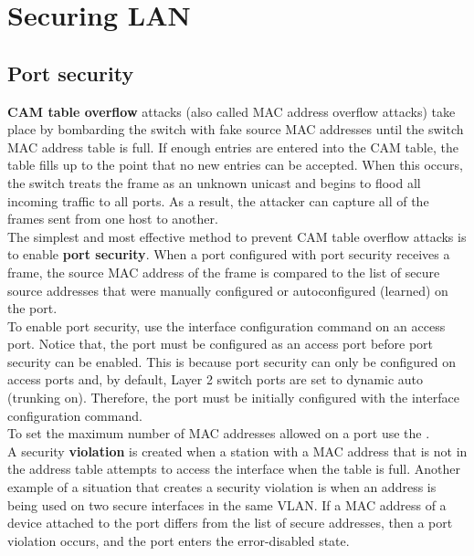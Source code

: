 \chapter{Securing LAN}

\section{Port security}

\textbf{CAM table overflow} attacks (also called MAC address overflow attacks) take place by bombarding the switch with fake source MAC addresses until the switch MAC address table is full. If enough entries are entered into the CAM table, the table fills up to the point that no new entries can be accepted. When this occurs, the switch treats the frame as an unknown unicast and begins to flood all incoming traffic to all ports. As a result, the attacker can capture all of the frames sent from one host to another.\\

The simplest and most effective method to prevent CAM table overflow attacks is to enable \textbf{port security}. When a port configured with port security receives a frame, the source MAC address of the frame is compared to the list of secure source addresses that were manually configured or autoconfigured (learned) on the port.\\

To enable port security, use the  interface configuration command on an access port. Notice that, the port must be configured as an access port before port security can be enabled. This is because port security can only be configured on access ports and, by default, Layer 2 switch ports are set to dynamic auto (trunking on). Therefore, the port must be initially configured with the  interface configuration command.\\

To set the maximum number of MAC addresses allowed on a port use the .\\

A security \textbf{violation} is created when a station with a MAC address that is not in the address table attempts to access the interface when the table is full. Another example of a situation that creates a security violation is when an address is being used on two secure interfaces in the same VLAN. If a MAC address of a device attached to the port differs from the list of secure addresses, then a port violation occurs, and the port enters the error-disabled state.\\

